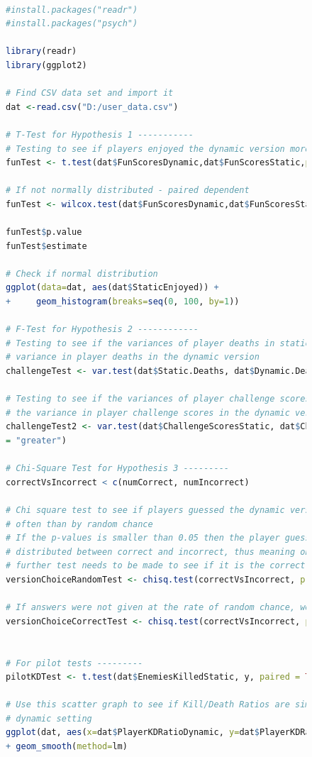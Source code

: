 \documentclass[journal]{IEEEtran}
\begin{document}
\begin{center}
\begin{figure}


\begin{lstlisting}[language=R]

#install.packages("readr")
#install.packages("psych")

library(readr)
library(ggplot2)

# Find CSV data set and import it
dat <-read.csv("D:/user_data.csv")

# T-Test for Hypothesis 1 -----------
# Testing to see if players enjoyed the dynamic version more than the static
funTest <- t.test(dat$FunScoresDynamic,dat$FunScoresStatic,paired=TRUE, alternative="greater")

# If not normally distributed - paired dependent
funTest <- wilcox.test(dat$FunScoresDynamic,dat$FunScoresStatic, paired = TRUE,  alternative="greater")

funTest$p.value
funTest$estimate

# Check if normal distribution
ggplot(data=dat, aes(dat$StaticEnjoyed)) + 
+     geom_histogram(breaks=seq(0, 100, by=1))

# F-Test for Hypothesis 2 ------------
# Testing to see if the variances of player deaths in static version is higher than the 
# variance in player deaths in the dynamic version
challengeTest <- var.test(dat$Static.Deaths, dat$Dynamic.Deaths, alternative = "greater")

# Testing to see if the variances of player challenge scores in static version is higher than 
# the variance in player challenge scores in the dynamic version
challengeTest2 <- var.test(dat$ChallengeScoresStatic, dat$ChallengeScoresDynamic, alternative
= "greater")

# Chi-Square Test for Hypothesis 3 ---------
correctVsIncorrect < c(numCorrect, numIncorrect)

# Chi square test to see if players guessed the dynamic version correctly more significantly
# often than by random chance
# If the p-values is smaller than 0.05 then the player guesses are significantly not commonly
# distributed between correct and incorrect, thus meaning one is significantly higher and a
# further test needs to be made to see if it is the correct answer
versionChoiceRandomTest <- chisq.test(correctVsIncorrect, p = c(1/2, 1/2))

# If answers were not given at the rate of random chance, were answers more often correct?
versionChoiceCorrectTest <- chisq.test(correctVsIncorrect, p = c(4/5, 1/5))


# For pilot tests ---------
pilotKDTest <- t.test(dat$EnemiesKilledStatic, y, paired = TRUE, alternative = "two.sided")

# Use this scatter graph to see if Kill/Death Ratios are similar between players using the
# dynamic setting
ggplot(dat, aes(x=dat$PlayerKDRatioDynamic, y=dat$PlayerKDRatioDynamic)) + geom_point() 
+ geom_smooth(method=lm)


\end{lstlisting}

\end{figure}

\end{center} 
 
\end{document}
